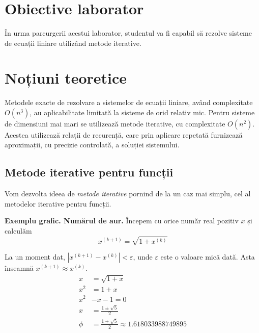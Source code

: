 \documentclass{exam}
\title{
	\textmd{\textbf{\MNLabTitle}}
	\author{}
	\date{}
}
\begin{document}
\begin{coverpages}
	\maketitle
	\thispagestyle{empty}
	\tableofcontents
\end{coverpages}

\section{Obiective laborator}

În urma parcurgerii acestui laborator, studentul va fi capabil să rezolve
sisteme de ecuații liniare utilizând metode iterative.

\section{Noțiuni teoretice}

Metodele exacte de rezolvare a sistemelor de ecuații liniare, având complexitate
$O(n^3)$, au aplicabilitate limitată la sisteme de orid relativ mic. Pentru
sisteme de dimensiuni mai mari se utilizează metode iterative, cu complexitate
$O(n^2)$. Acestea utilizează relații de recurență, care prin aplicare repetată
furnizează aproximații, cu precizie controlată, a soluției sistemului.

\subsection{Metode iterative pentru funcții}

Vom dezvolta ideea de \textit{metode iterative} pornind de la un caz mai simplu,
cel al metodelor iterative pentru funcții.

\textbf{Exemplu grafic. Numărul de aur.} Începem cu orice număr real pozitiv $x$
și calculăm
\begin{equation*}
	x^{(k+1)} = \sqrt{1 + x^{(k)}}
\end{equation*}

La un moment dat, $|x^{(k+1)} - x^{(k)}| < \varepsilon$, unde $\varepsilon$ este
o valoare mică dată. Asta înseamnă $x^{(k+1)} \approx x^{(k)}$.
\begin{align*}
	x    & = \sqrt{1 + x}                                     \\
	x^2  & = 1 + x                                            \\
	x^2  & - x - 1 = 0                                        \\
	x    & = \frac{1 \pm \sqrt{5}}{2}                         \\
	\phi & = \frac{1 + \sqrt{5}}{2} \approx 1.618033988749895
\end{align*}
\end{document}
